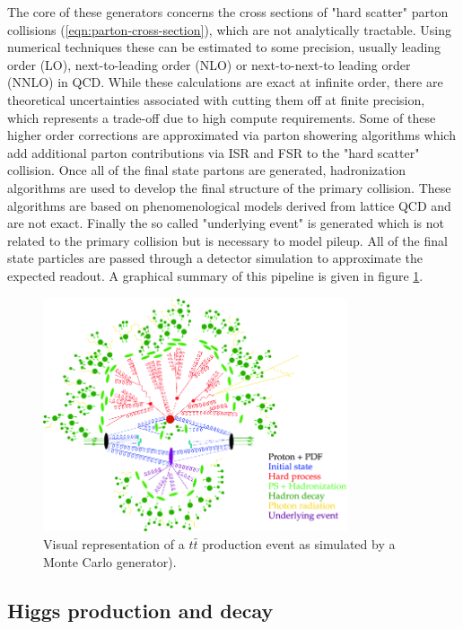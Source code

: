 The core of these generators concerns the cross sections of "hard scatter" parton collisions 
(\ref{eqn:parton-cross-section}), which are not analytically tractable. Using numerical techniques these can be 
estimated to some precision, usually leading order (LO), next-to-leading order (NLO) or next-to-next-to leading 
order (NNLO) in QCD. While these calculations are exact at infinite order, there are theoretical uncertainties 
associated with cutting them off at finite precision, which represents a trade-off due to high compute 
requirements. Some of these higher order corrections are approximated via parton showering algorithms which 
add additional parton contributions via ISR and FSR to the "hard scatter" collision. Once all of the final state 
partons are generated, hadronization algorithms are used to develop the final structure of the primary collision. 
These algorithms are based on phenomenological models derived from lattice QCD and are not exact. Finally 
the so called "underlying event" is generated which is not related to the primary collision but is necessary to 
model pileup. All of the final state particles are passed through a detector simulation to approximate the 
expected readout. A graphical summary of this pipeline is given in figure \ref{fig:Monte_Carlo}.

\begin{figure}
\centering
    \includegraphics[width=0.8\textwidth]{images/Monte_Carlo.png}
    \caption{Visual representation of a $t\bar{t}$ production event as simulated by a Monte Carlo generator).}
    \label{fig:Monte_Carlo}
\end{figure}

\subsection{Higgs production and decay}


